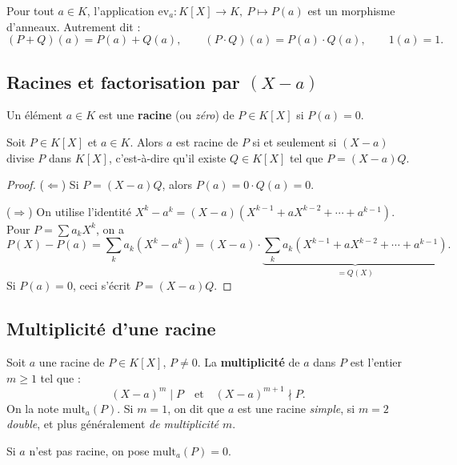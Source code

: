 \begin{proposition}
Pour tout $a \in K$, l'application $\mathrm{ev}_a : K[X] \to K,\ P \mapsto P(a)$ est un morphisme d'anneaux. Autrement dit :
\[ (P + Q)(a) = P(a) + Q(a), \qquad (P \cdot Q)(a) = P(a) \cdot Q(a), \qquad 1(a) = 1. \]
\end{proposition}

\subsection{Racines et factorisation par $(X - a)$}

\begin{definition}[Racine]
Un élément $a \in K$ est une \textbf{racine} (ou \emph{zéro}) de $P \in K[X]$ si $P(a) = 0$.
\end{definition}

\begin{theoreme}
Soit $P \in K[X]$ et $a \in K$. Alors $a$ est racine de $P$ si et seulement si $(X - a)$ divise $P$ dans $K[X]$, c'est-à-dire qu'il existe $Q \in K[X]$ tel que $P = (X - a) Q$.
\end{theoreme}

\begin{proof}
($\Leftarrow$) Si $P = (X - a) Q$, alors $P(a) = 0 \cdot Q(a) = 0$.

($\Rightarrow$) On utilise l'identité $X^k - a^k = (X - a)(X^{k-1} + a X^{k-2} + \cdots + a^{k-1})$. Pour $P = \sum a_k X^k$, on a
\[ P(X) - P(a) = \sum_{k} a_k (X^k - a^k) = (X - a) \cdot \underbrace{\sum_{k} a_k (X^{k-1} + a X^{k-2} + \cdots + a^{k-1})}_{= Q(X)}. \]
Si $P(a) = 0$, ceci s'écrit $P = (X - a) Q$.
\end{proof}

\subsection{Multiplicité d'une racine}

\begin{definition}[Multiplicité]
Soit $a$ une racine de $P \in K[X]$, $P \neq 0$. La \textbf{multiplicité} de $a$ dans $P$ est l'entier $m \ge 1$ tel que :
\[ (X - a)^m \mid P \quad \text{et} \quad (X - a)^{m+1} \nmid P. \]
On la note $\mathrm{mult}_a(P)$. Si $m = 1$, on dit que $a$ est une racine \emph{simple}, si $m = 2$ \emph{double}, et plus généralement \emph{de multiplicité $m$}.

Si $a$ n'est pas racine, on pose $\mathrm{mult}_a(P) = 0$.
\end{definition}


